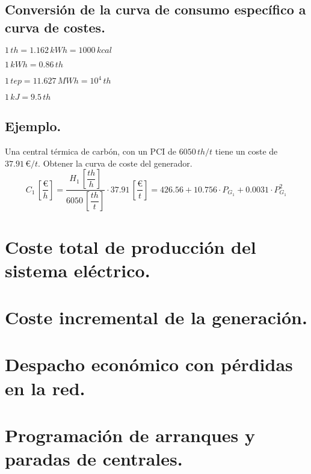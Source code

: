 		\subsection{Conversión de la curva de consumo específico a curva de costes.}
			$1\,th = 1.162\,kWh = 1000\,kcal$
			
			$1\,kWh = 0.86\,th$
			
			$1\,tep = 11.627\,MWh = 10^4\,th$
			
			$1\,kJ = 9.5\,th$
			
		\subsection*{Ejemplo.}
			Una central térmica de carbón, con un PCI de $6050\,th/t$ tiene un coste de $37.91\,\euro/t$. Obtener la curva de coste del generador.
			\[C_1\,\left[\dfrac{\euro}{h}\right] = \dfrac{H_1\,\left[\dfrac{th}{h}\right]}{6050\,\left[\dfrac{th}{t}\right]} \cdot 37.91\,\left[\dfrac{\euro}{t}\right] = 426.56 + 10.756\cdot P_{G_1} + 0.0031\cdot P_{G_1}^2\]
	
	\section{Coste total de producción del sistema eléctrico.}
		\subsection{}
	
	\section{Coste incremental de la generación.}
		\subsection{}
	
	\section{Despacho económico con pérdidas en la red.}
		\subsection{}
	
	\section{Programación de arranques y paradas de centrales.}
		\subsection{}
	